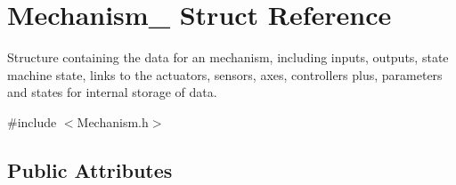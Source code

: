 \hypertarget{struct_mechanism__}{}\section{Mechanism\+\_\+ Struct Reference}
\label{struct_mechanism__}


Structure containing the data for an mechanism, including inputs, outputs, state machine state, links to the actuators, sensors, axes, controllers plus, parameters and states for internal storage of data.  




{\ttfamily \#include $<$Mechanism.\+h$>$}

\subsection*{Public Attributes}
